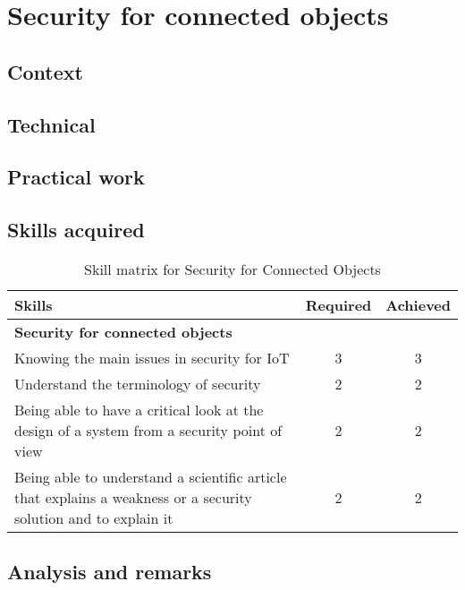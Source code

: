 \section{Security for connected objects}
\subsection{Context}
\subsection{Technical}
\subsection{Practical work}
\subsection{Skills acquired}
\begin{table}[h!]
    \centering
    \renewcommand{\arraystretch}{1.5} %
    \begin{tabular}{|p{11cm}|c|c|}
    \hline
    \rowcolor[gray]{0.8}
    \textbf{Skills} & \textbf{Required} & \textbf{Achieved} \\ \hline
    \rowcolor[gray]{0.9} \textbf{Security for connected objects} &  &  \\ \hline
    Knowing the main issues in security for IoT & 3 & 3 \\ \hline
    Understand the terminology of security & 2 & 2 \\ \hline
    Being able to have a critical look at the design of a system from a security point of view & 2 & 2 \\ \hline
    Being able to understand a scientific article that explains a weakness or a security solution and to explain it & 2 & 2 \\ \hline
    \end{tabular}
    \caption{Skill matrix for Security for Connected Objects}
    \label{table:skills-security-iot}
\end{table}

\subsection{Analysis and remarks}